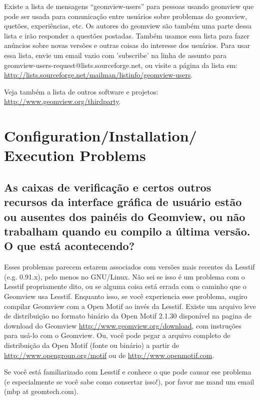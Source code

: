 \documentclass[12pt,a4paper]{article}
\begin{document}
        Existe a lista de mensagens ``geomview-users'' para pessoas usando geomview que
        pode ser usada para comunica\c{c}\~ao entre usu\'arios sobre problemas do geomview,
        quet\~oes, experi\^encias, etc. Os autores do geomview s\~ao tamb\'em uma parte dessa
        lista e ir\~ao responder a quest\~oes postadas. Tamb\'em usamos essa
        lista para fazer an\'uncios sobre novas vers\~oes e outras coisas do
        interesse dos usu\'arios. Para usar essa lista, envie um email vazio com 'subscribe'
        na linha de assunto para geomview-users-request@lists.sourceforge.net, ou visite a p\'agina
        da lista em:
        \url{http://lists.sourceforge.net/mailman/listinfo/geomview-users}.
	
        Veja tamb\'em a lista de outros software e projetos:
        \url{http://www.geomview.org/thirdparty}.

\section{Configuration/Installation/ Execution Problems}

    \subsection{As caixas de verifica\c{c}\~ao e certos outros recursos da interface gr\'afica de usu\'ario est\~ao ou 
    ausentes dos pain\'eis do Geomview, ou n\~ao trabalham quando eu compilo 
    a \'ultima vers\~ao. O que est\'a acontecendo?}

        Esses problemas parecem estarem associados com vers\~oes mais recentes da Lesstif
        (e.g. 0.91.x), pelo menos no GNU/Linux. N\~ao sei se isso \'e um problema
        com o Lesstif propriamente dito, ou se alguma coisa est\'a errada com o caminho que o Geomview usa
        Lesstif. Enquanto isso, se voc\^e experiencia esse problema, sugiro
        compilar Geomview com a Open Motif ao inv\'es da Lesstif. Existe um
        arquivo leve de distribui\c{c}\~ao no formato bin\'ario da Open Motif 2.1.30 dispon\'ivel na
        pagina de download do Geomview  \url{http://www.geomview.org/download}, com
        instru\c{c}\~oes para us\'a-lo com o Geomview. Ou, voc\^e pode pegar a arquivo completo de distribui\c{c}\~ao da
        Open Motif (fonte ou bin\'ario) a partir de \url{http://www.opengroup.org/motif}
        ou de \url{http://www.openmotif.com}.

        Se voc\^e est\'a familiarizado com Lesstif e conhece o que pode causar ese problema
        (e especialmente se voc\^e sabe como consertar isso!), por favor me mand um email
        (mbp at geomtech.com).
\end{document}
